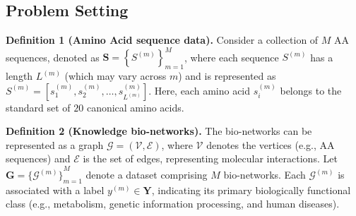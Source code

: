 \subsection{Problem Setting}\label{subsec:data}
\noindent\textbf{Definition 1 (Amino Acid sequence data).}
Consider a collection of $M$ AA sequences, denoted as 
$\mathbf{S} = \left\{ S^{(m)} \right\}_{m=1}^{M}$,
where each sequence $S^{(m)}$ has a length $L^{(m)}$ (which may vary across $m$) and is represented as
$
S^{(m)} = \left[s_1^{(m)}, s_2^{(m)}, \dots, s_{L^{(m)}}^{(m)}\right]$.
Here, each amino acid $s_i^{(m)}$ belongs to the standard set of $20$ canonical amino acids.



\noindent\textbf{Definition 2 (Knowledge bio-networks).}
The bio-networks can be represented as a graph $\mathcal{G} = (\mathcal{V}, \mathcal{E})$, where $\mathcal{V}$ denotes the vertices (e.g., AA sequences) and $\mathcal{E}$ is the set of edges, representing molecular interactions. 
Let $\mathbf{G} = {\{\mathcal{G}^{(m)}\}}_{m=1}^{M}$ denote a dataset comprising $M$ bio-networks. 
Each $\mathcal{G}^{(m)}$ is associated with a label $y^{(m)} \in \mathbf{Y}$, indicating its primary biologically functional class (e.g., {metabolism}, {genetic information processing}, and {human diseases}).


